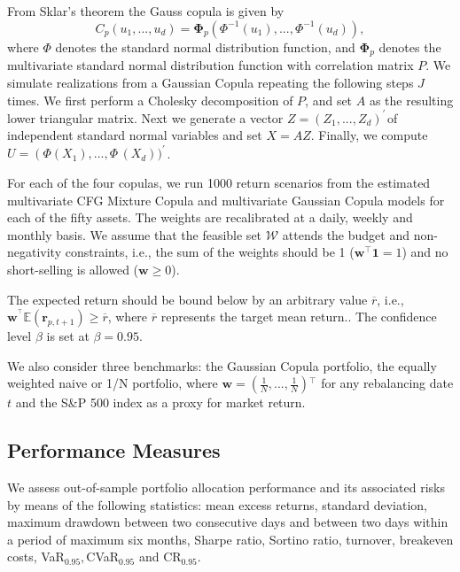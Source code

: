 \documentclass[a4paper,10pt]{article}
\begin{document}
From Sklar's theorem the Gauss copula is given by \begin{equation}C_{p}\left (u_{1} , . . . ,u_{d}\right ) =\mathbf{\Phi }_{p}\left (\Phi ^{ -1}(u_{1}) , . . . ,\Phi ^{ -1}(u_{d})\right ) ,
\end{equation}where $\Phi $ denotes the standard normal distribution function, and $\mathbf{\Phi }_{p}$ denotes the multivariate standard normal distribution function with correlation matrix $P .$ We simulate realizations from a Gaussian Copula repeating the following steps $J$ times. We first perform a Cholesky decomposition of $P$, and set $A$ as the resulting lower triangular matrix. Next we generate a vector $Z =\left (Z_{1} , . . . ,Z_{d}\right )^{ \prime ^{\,}}$of independent standard normal variables and set $X =AZ$. Finally, we compute $U =\left (\Phi (X_{1})\right . , . . . ,\Phi ^{\,}(X_{d}))^{ \prime ^{\,}}$.


For each of the four copulas, we run 1000 return scenarios from the
estimated multivariate CFG Mixture Copula and multivariate Gaussian Copula models for each of the fifty assets.
The weights are recalibrated at a daily, weekly and monthly basis. We assume
that the feasible set $\mathcal{W}$ attends the budget and non-negativity
constraints, i.e., the sum of the weights should be 1  ($\mathbf{w}^{\top }\mathbf{1=}1$) and no short-selling is allowed ($\mathbf{w\geq }0$).


The expected return should be bound
below by an arbitrary value $\overline{r}$, i.e., $\mathbf{w}^{^{\top }}\mathbb{E}\left( \mathbf{r}%
_{p,t+1}\right) \mathbf{\geq }\overline{r}$, where $\overline{r}$ represents the target mean
return.. The confidence level $\beta $ is
set at $\beta =0.95$.


We also consider three benchmarks: the Gaussian Copula portfolio, the equally weighted naive or 1/N portfolio,
where $\mathbf{w=}\left( \frac{1}{N},...,\frac{1}{N}\right) {^{\top }}$ for
any rebalancing date $t$ and the S\&P 500 index as a proxy for market return.

\bigskip

\subsection{Performance Measures}

We assess out-of-sample portfolio allocation performance and its associated
risks by means of the following statistics: mean excess returns, standard
deviation, maximum drawdown between two consecutive days and between two
days within a period of maximum six months, Sharpe ratio, Sortino ratio,
turnover, breakeven costs, VaR$_{0.95}, $CVaR$_{0.95}$ and CR$_{0.95}$.
\end{document}
